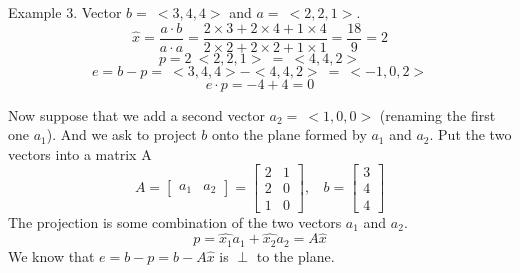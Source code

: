 \documentclass[11pt, oneside]{article}
\begin{document}
\noindent Example 3.  Vector $b = \ <3,4,4>$ and $a = \ <2,2,1>$.
\[ \hat{x} = \frac{a \cdot b}{ a\cdot a} = \frac{2 \times 3 + 2 \times 4 + 1 \times 4}{2 \times 2 + 2 \times 2 + 1 \times 1} = \frac{18}{9} = 2\]
\[ p = 2 \ <2,2,1> \ = \ <4,4,2> \]
\[ e = b-p =  \ <3,4,4> - <4,4,2> \ = \ <-1,0,2> \]
\[ e \cdot p = -4 + 4 = 0 \]

Now suppose that we add a second vector $a_2 = \ <1,0,0>$ (renaming the first one $a_1$).  And we ask to project $b$ onto the plane formed by $a_1$ and $a_2$.  Put the two vectors into a matrix A
\[A =
\begin{bmatrix} 
  a_1  &  a_2
\end{bmatrix}
=
\begin{bmatrix} 
  2  &  1   \\ 
  2  &  0  \\
  1  &  0
\end{bmatrix}
, \ \ \ \ 
b = 
\begin{bmatrix} 
  3   \\ 
  4   \\
  4
\end{bmatrix}
\]
The projection is some combination of the two vectors $a_1$ and $a_2$.
\[ p = \hat{x_1} a_1 + \hat{x_2} a_2 = A \hat{x} \]
We know that $e=b-p=b-A\hat{x}$ is $\perp$ to the plane.
\end{document}

